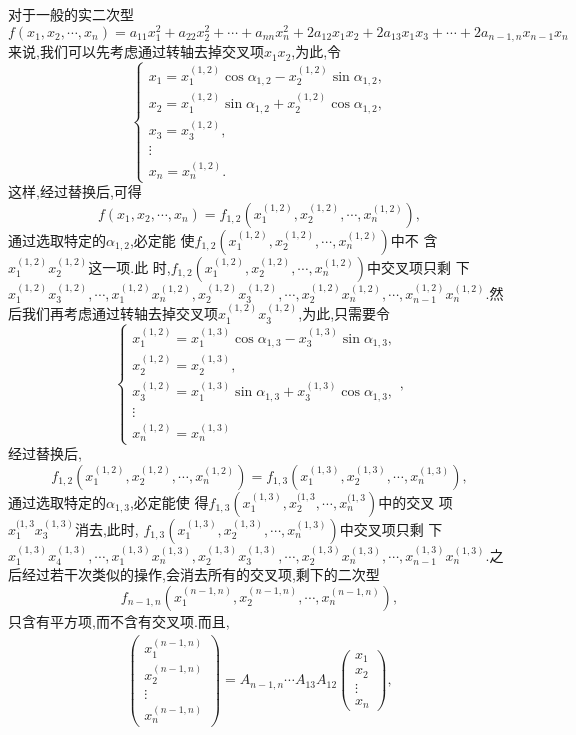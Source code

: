\documentclass[a4paper]{article}
\begin{document}
对于一般的实二次型
$$
f(x_1,x_2,\cdots,x_n)=a_{11}x_1^2+a_{22}x_2^2+\cdots+a_{nn}x_n^2+2a_{12}x_1x_2+2a_{13}x_1x_3+\cdots+2a_{n-1,n}x_{n-1}x_n
$$
来说,我们可以先考虑通过转轴去掉交叉项$x_1x_2$,为此,令
$$
\begin{cases}
  x_1=x_{1}^{(1,2)}\cos\alpha_{1,2}-x_{2}^{(1,2)}\sin\alpha_{1,2},\\
  x_2=x_{1}^{(1,2)}\sin\alpha_{1,2}+x_{2}^{(1,2)}\cos\alpha_{1,2},\\
  x_3=x_3^{(1,2)},\\
  \vdots\\
  x_n=x_n^{(1,2)}.
\end{cases}
$$
这样,经过替换后,可得
$$
f(x_1,x_2,\cdots,x_n)=f_{1,2}(x_1^{(1,2)},x_2^{(1,2)},\cdots,x_n^{(1,2)}),
$$
通过选取特定的$\alpha_{1,2}$,必定能
使$f_{1,2}(x_1^{(1,2)},x_2^{(1,2)},\cdots,x_n^{(1,2)})$中不
含$x_1^{(1,2)}x_2^{(1,2)}$这一项.此
时,$f_{1,2}(x_1^{(1,2)},x_2^{(1,2)},\cdots,x_n^{(1,2)})$中交叉项只剩
下
$x_1^{(1,2)}x_3^{(1,2)},\cdots,x_1^{(1,2)}x_n^{(1,2)},x_2^{(1,2)}x_{3}^{(1,2)},\cdots,x_2^{(1,2)}x_{n}^{(1,2)},\cdots,x_{n-1}^{(1,2)}x_n^{(1,2)}$.然
后我们再考虑通过转轴去掉交叉项$x_1^{(1,2)}x_3^{(1,2)}$,为此,只需要令
$$
\begin{cases} 
  x_1^{(1,2)}=x_1^{(1,3)}\cos\alpha_{1,3}-x_3^{(1,3)}\sin\alpha_{1,3},\\
  x_2^{(1,2)}=x_2^{(1,3)},\\
  x_3^{(1,2)}=x_1^{(1,3)}\sin\alpha_{1,3}+x_3^{(1,3)}\cos\alpha_{1,3},\\
  \vdots\\
  x_n^{(1,2)}=x_n^{(1,3)}
\end{cases},
$$
经过替换后,
$$
f_{1,2}(x_1^{(1,2)},x_2^{(1,2)},\cdots,x_n^{(1,2)})=f_{1,3}(x_1^{(1,3)},x_2^{(1,3)},\cdots,x_n^{(1,3)}),
$$
通过选取特定的$\alpha_{1,3}$,必定能使
得$f_{1,3}(x_1^{(1,3)},x_2^{(1,3},\cdots,x_n^{(1,3})$中的交叉
项$x_1^{(1,3}x_3^{(1,3)}$消去,此时,
$f_{1,3}(x_1^{(1,3)},x_2^{(1,3)},\cdots,x_n^{(1,3)})$中交叉项只剩
下
$x_1^{(1,3)}x_4^{(1,3)},\cdots,x_1^{(1,3)}x_n^{(1,3)},x_2^{(1,3)}x_{3}^{(1,3)},\cdots,x_2^{(1,3)}x_{n}^{(1,3)},\cdots,x_{n-1}^{(1,3)}x_n^{(1,3)}$.之
后经过若干次类似的操作,会消去所有的交叉项,剩下的二次型
$$
f_{n-1,n}(x_1^{(n-1,n)},x_2^{(n-1,n)},\cdots,x_n^{(n-1,n)}),
$$
只含有平方项,而不含有交叉项.而且,
\begin{align*}
  \begin{pmatrix}
    x_1^{(n-1,n)}\\
    x_2^{(n-1,n)}\\
    \vdots\\
    x_n^{(n-1,n)}
  \end{pmatrix}= A_{n-1,n}\cdots A_{13}A_{12}
  \begin{pmatrix}
    x_1\\
    x_2\\
    \vdots\\
    x_n
  \end{pmatrix},
\end{align*}
\end{document}
